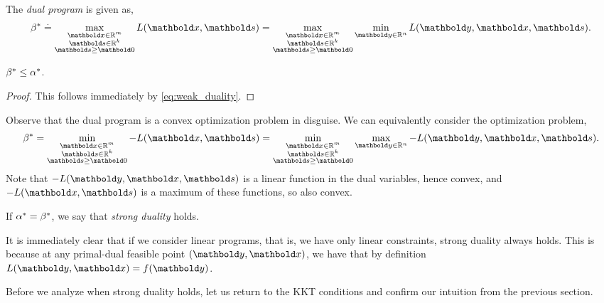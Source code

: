 \begin{defn} The \emph{dual program} is given as, \begin{align}
    \s{\beta} \defeq \max_{\substack{\vx \in \R^m \\ \vs \in \R^k \\ \vs \geq \vZero}} L(\vx, \vs) = \max_{\substack{\vx \in \R^m \\ \vs \in \R^k \\ \vs \geq \vZero}} \min_{\vy \in \R^n} L(\vy, \vx, \vs).
\end{align}
\end{defn}
\begin{thm}
$\beta^* \leq \alpha^*$.
\end{thm}
\begin{proof}
This follows immediately by \cref{eq:weak_duality}.
\end{proof}
\begin{rmk}
Observe that the dual program is a convex optimization problem in disguise. We can equivalently consider the optimization problem, \begin{align}
    \s{\beta} = \min_{\substack{\vx \in \R^m \\ \vs \in \R^k \\ \vs \geq \vZero}} - L(\vx, \vs) = \min_{\substack{\vx \in \R^m \\ \vs \in \R^k \\ \vs \geq \vZero}} \max_{\vy \in \R^n} - L(\vy, \vx, \vs).
\end{align} Note that $-L(\vy, \vx, \vs)$ is a linear function in the dual variables, hence convex, and $-L(\vx, \vs)$ is a maximum of these functions, so also convex.
\end{rmk}

\begin{defn} If $\alpha^* = \beta^*$, we say that \emph{strong duality} holds.
\end{defn}
\begin{rmk}
It is immediately clear that if we consider linear programs, that is, we have only linear constraints, strong duality always holds. This is because at any primal-dual feasible point $(\vy, \vx)$, we have that by definition $L(\vy, \vx) = f(\vy)$.
\end{rmk}

Before we analyze when strong duality holds, let us return to the KKT conditions and confirm our intuition from the previous section.

